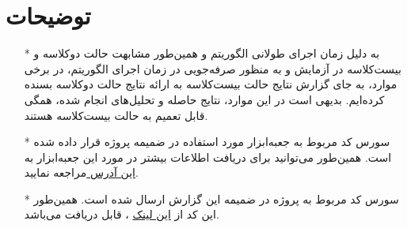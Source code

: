 \documentclass[11.5pt,a4paper]{article}
\begin{document}
\section{توضیحات}
\begin{itemize}
\item [*]به دلیل زمان اجرای طولانی الگوریتم و همین‌طور مشابهت حالت دوکلاسه و بیست‌کلاسه در آزمایش و به منظور صرفه‌جویی در زمان اجرای الگوریتم، در برخی موارد، به جای گزارش نتایج حالت بیست‌کلاسه به ارائه نتایج حالت دوکلاسه بسنده کرده‌ایم. بدیهی‌ است  در این موارد، نتایج حاصله و تحلیل‌های انجام شده، همگی قابل تعمیم به حالت بیست‌کلاسه هستند.
\item [*] سورس کد مربوط به جعبه‌ابزار مورد استفاده در ضمیمه پروژه قرار داده شده است. همین‌طور می‌توانید برای دریافت اطلاعات بیشتر در مورد این جعبه‌ابزار به 
\href{http://www.openpr.org.cn/index.php/NLP-Toolkit-for-Natural-Language-Processing/43-Naive-Bayes-Classfier/View-details.html}{این آدرس }
مراجعه نمایید.

\item [*] سورس کد مربوط به پروژه در ضمیمه این گزارش ارسال شده است. همین‌طور این کد از
\href{https://github.com/ahmad-asadi/PGM/tree/master/BayesianNetwork}
{این لینک}
، قابل 
دریافت می‌باشد.
\end{itemize}
\end{document}
